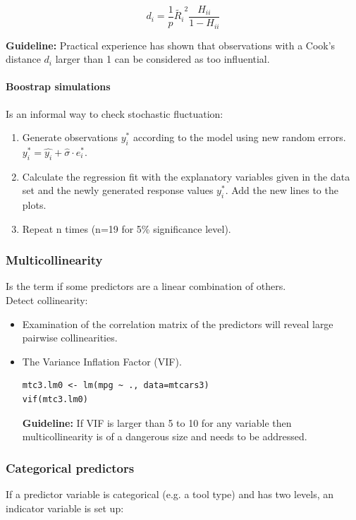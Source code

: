 \begin{equation*}
d_i = \frac{1}{p}\tilde{R_i}^2\frac{H_{ii}}{1-H_{ii}}
\end{equation*}

\textbf{Guideline:} Practical experience has shown that observations with a Cook’s distance $d_i$ larger than 1 can be considered as too influential.

\paragraph{Boostrap simulations}
Is an informal way to check stochastic fluctuation:
\begin{enumerate}
	\tightlist
	\item Generate observations $y_i^*$ according to the model using new random errors.\\
	$y_i^*=\hat{y_i}+\hat{\sigma}\cdot e_i^*$.
	\item Calculate the regression fit with the explanatory variables given in the data set and the newly generated response values $y_i^*$. Add the new lines to the plots.
	\item Repeat n times (n=19 for 5\% significance level).
\end{enumerate}

\subsubsection{Multicollinearity}
Is the term if some predictors are a linear combination of others.\\
Detect collinearity:
\begin{itemize}
	\tightlist
	\item Examination of the correlation matrix of the predictors will reveal large pairwise collinearities.
	\item The Variance Inflation Factor (VIF).\\
	\begin{lstlisting}
mtc3.lm0 <- lm(mpg ~ ., data=mtcars3)
vif(mtc3.lm0)
	\end{lstlisting}
	\textbf{Guideline:} If VIF is larger than 5 to 10 for any variable then multicollinearity is of a dangerous size and needs to be addressed.
\end{itemize}

\subsubsection{Categorical predictors}
If a predictor variable is categorical (e.g. a tool type) and has two levels, an indicator variable is set up:


